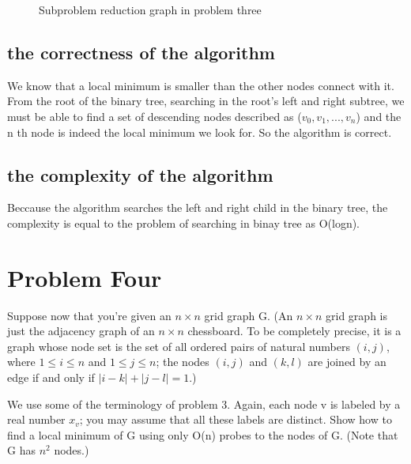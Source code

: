 \documentclass{article}
\begin{document}
\begin{CJK*}{UTF8}{gbsn}
\begin{figure}[H]
\caption{Subproblem reduction graph in problem three} 
\end{figure}

\subsection{the correctness of the algorithm}

We know that a local minimum is smaller than the other nodes connect with it. From the root of the binary  tree, searching in the root's left and right subtree, we must be able to find a set of descending nodes described as ($v_0, v_1, ... , v_n$) and the n th node is indeed the local minimum we look for. So the algorithm is correct.

\subsection{the complexity of the algorithm}

Beccause the algorithm searches the left and right child in the binary tree, the complexity is equal to the problem of searching in binay tree as O(logn).


\newpage
\section{Problem Four}
Suppose now that you're given an $n \times n$ grid graph G. (An $n \times n$ grid graph is just the adjacency graph of an $n\times n$ chessboard. To be completely precise, it is a graph whose node set is the set of all ordered pairs of natural numbers $(i,j)$, where $1 \leq i \leq n$ and $1 \leq j \leq n$; the nodes $(i,j)$ and $(k,l)$ are joined by an edge if and only if $|i-k|+|j-l| = 1$.)

We use some of the terminology of problem 3. Again, each node v is labeled by a real number $x_v$; you may assume that all these labels are distinct. Show how to find a local minimum of G using only O(n) probes to the nodes of G. (Note that G has $n^2$ nodes.)



\end{CJK*}
\end{document}
